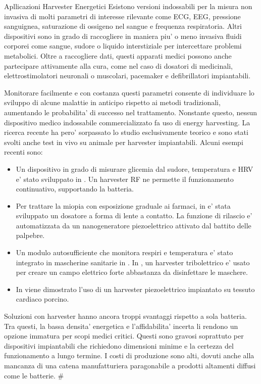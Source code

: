 \begin{section}{Apllicazioni Harvester Energetici}
    Esistono versioni indossabili per la misura non invasiva di molti parametri di interesse rilevante come ECG, EEG, pressione sanguignea, saturazione di ossigeno nel sangue e frequenza respiratoria. Altri dispositivi sono in grado di raccogliere in maniera piu' o meno invasiva fluidi corporei come sangue, sudore o liquido interstiziale per intercettare problemi metabolici. Oltre a raccogliere dati, questi apparati medici possono anche partecipare attivamente alla cura, come nel caso di dosatori di medicinali, elettrostimolatori neuronali o muscolari, pacemaker e defibrillatori impiantabili.
    
    Monitorare facilmente e con costanza questi parametri consente di individuare lo sviluppo di alcune malattie in anticipo rispetto ai metodi tradizionali, aumentando le probabilita' di successo nel trattamento. Nonstante questo, nessun dispositivo medico indossabile commercializzato fa uso di energy harvesting. La ricerca recente ha pero' sorpassato lo studio esclusivamente teorico e sono stati svolti anche test in vivo su animale per harvester impiantabili. Alcuni esempi recenti sono: \begin{itemize}
        \item Un dispositivo in grado di misurare glicemia dal sudore, temperatura e HRV e' stato sviluppato in \cite{mirlouContinuousGlycemicMonitoring2024}. Un harvester RF ne permette il funzionamento continuativo, supportando la batteria.
        \item Per trattare la miopia con esposizione graduale ai farmaci, in \cite{jiangSelfgeneratedElectricitydrivenDrug2024} e' stata sviluppato un dosatore a forma di lente a contatto. La funzione di rilascio e' automatizzata da un nanogeneratore piezoelettrico attivato dal battito delle palpebre.
        \item Un modulo autosufficiente che monitora respiri e temperatura e' stato integrato in mascherine sanitarie in \cite{lanHighefficientIntelligentAntibacterial2024}. In \cite{simInstantDisinfectingFace}, un harvester tribolettrico e' usato per creare un campo elettrico forte abbastanza da disinfettare le maschere.
        \item In \cite{PanVivoFlexibleEnergy2024} viene dimostrato l'uso di un harvester piezoelettrico impiantato su tessuto cardiaco porcino.
    \end{itemize}
 
    Soluzioni con harvester hanno ancora troppi svantaggi rispetto a sola batteria. Tra questi, la bassa densita' energetica e l'affidabilita' incerta li rendono un opzione immatura per scopi medici critici. Questi sono gravosi soprattuto per dispositivi impiantabili che richiedono dimensioni minime e la certezza del funzionamento a lungo termine. I costi di produzione sono alti, dovuti anche alla mancanza di una catena manufatturiera paragonabile a prodotti altamenti diffusi come le batterie. \#


\end{section}
